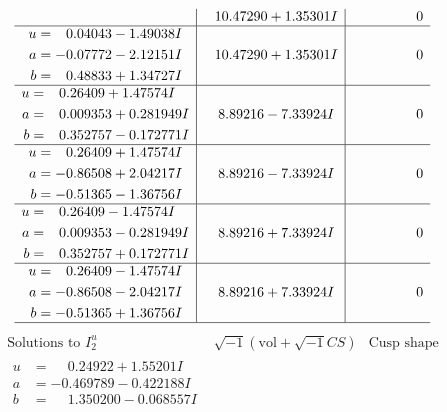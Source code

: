 \documentclass[1p]{elsarticle_modified}
\theoremstyle{definition}
\newcommand{\I}{\sqrt{-1}}
\begin{document}
$$\begin{array}{c|c|c}
 & \phantom{-}10.47290 + 1.35301 I & \phantom{-0.000000 } 0 \\ \hline\begin{aligned}
u &= \phantom{-}0.04043 - 1.49038 I \\
a &= -0.07772 - 2.12151 I \\
b &= \phantom{-}0.48833 + 1.34727 I\end{aligned}
 & \phantom{-}10.47290 + 1.35301 I & \phantom{-0.000000 } 0 \\ \hline\begin{aligned}
u &= \phantom{-}0.26409 + 1.47574 I \\
a &= \phantom{-}0.009353 + 0.281949 I \\
b &= \phantom{-}0.352757 - 0.172771 I\end{aligned}
 & \phantom{-}8.89216 - 7.33924 I & \phantom{-0.000000 } 0 \\ \hline\begin{aligned}
u &= \phantom{-}0.26409 + 1.47574 I \\
a &= -0.86508 + 2.04217 I \\
b &= -0.51365 - 1.36756 I\end{aligned}
 & \phantom{-}8.89216 - 7.33924 I & \phantom{-0.000000 } 0 \\ \hline\begin{aligned}
u &= \phantom{-}0.26409 - 1.47574 I \\
a &= \phantom{-}0.009353 - 0.281949 I \\
b &= \phantom{-}0.352757 + 0.172771 I\end{aligned}
 & \phantom{-}8.89216 + 7.33924 I & \phantom{-0.000000 } 0 \\ \hline\begin{aligned}
u &= \phantom{-}0.26409 - 1.47574 I \\
a &= -0.86508 - 2.04217 I \\
b &= -0.51365 + 1.36756 I\end{aligned}
 & \phantom{-}8.89216 + 7.33924 I & \phantom{-0.000000 } 0\\
 \hline 
 \end{array}$$\newpage$$\begin{array}{c|c|c}  
\text{Solutions to }I^u_{2}& \I (\text{vol} + \sqrt{-1}CS) & \text{Cusp shape}\\
 \hline 
\begin{aligned}
u &= \phantom{-}0.24922 + 1.55201 I \\
a &= -0.469789 - 0.422188 I \\
b &= \phantom{-}1.350200 - 0.068557 I\end{aligned}

\end{array}$$
\end{document}
